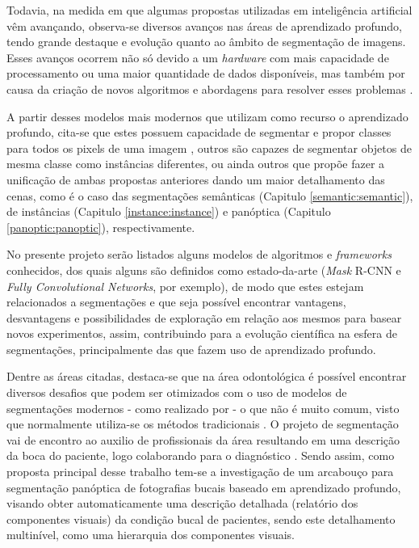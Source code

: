 Todavia, na medida em que algumas propostas utilizadas em inteligência artificial vêm avançando, observa-se diversos avanços nas áreas de aprendizado profundo, tendo grande destaque e evolução quanto ao âmbito de segmentação de imagens. Esses avanços ocorrem não só devido a um \textit{hardware} com mais capacidade de processamento ou uma maior quantidade de dados disponíveis, mas também por causa da criação de novos algoritmos e abordagens para resolver esses problemas \cite{Szegedy2015}.

A partir desses modelos mais modernos que utilizam como recurso o aprendizado profundo, cita-se que estes possuem capacidade de segmentar e propor classes para todos os pixels de uma imagem \cite{Minaee2021}, outros são capazes de segmentar objetos de mesma classe como instâncias diferentes, ou ainda outros que propõe fazer a unificação de ambas propostas anteriores dando um maior detalhamento das cenas, como é o caso das segmentações semânticas (Capitulo \ref{semantic:semantic}), de instâncias (Capitulo \ref{instance:instance}) e panóptica (Capitulo \ref{panoptic:panoptic}), respectivamente.

No presente projeto serão listados alguns modelos de algoritmos e \textit{frameworks} conhecidos, dos quais alguns são definidos como estado-da-arte (\textit{Mask} R-CNN e \textit{Fully Convolutional Networks}, por exemplo), de modo que estes estejam relacionados a segmentações e que seja possível encontrar vantagens, desvantagens e possibilidades de exploração em relação aos mesmos para basear novos experimentos, assim, contribuindo para a evolução científica na esfera de segmentações, principalmente das que fazem uso de aprendizado profundo.

Dentre as áreas citadas, destaca-se que na área odontológica é possível encontrar diversos desafios que podem ser otimizados com o uso de modelos de segmentações modernos - como realizado por \cite{Ghazvinian2021, Minyoung2020} - o que não é muito comum, visto que normalmente utiliza-se os métodos tradicionais \cite{Hammad2020}.  O projeto de segmentação vai de encontro ao auxilio de profissionais da área resultando em uma descrição da boca do paciente, logo colaborando para o diagnóstico \cite{Ghazvinian2021}. Sendo assim, como proposta principal desse trabalho tem-se a investigação de um arcabouço para segmentação panóptica de fotografias bucais baseado em aprendizado profundo, visando obter automaticamente uma descrição detalhada (relatório dos componentes visuais) da condição bucal de pacientes, sendo este detalhamento multinível, como uma hierarquia dos componentes visuais.

